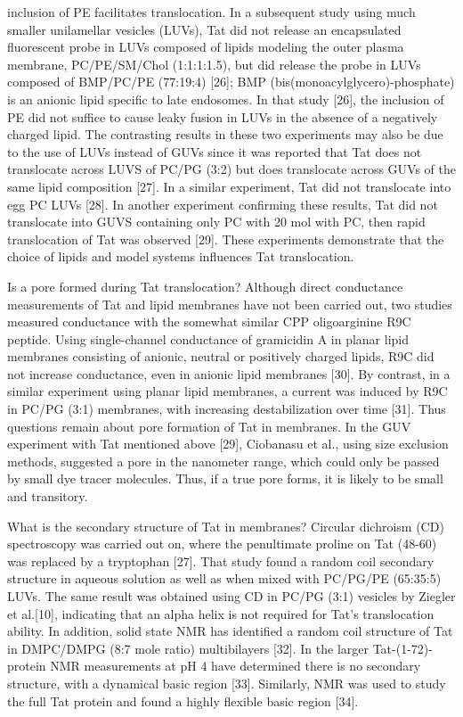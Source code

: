 inclusion of PE
facilitates translocation. In a subsequent study using much smaller unilamellar 
vesicles (LUVs),
Tat did not release an encapsulated fluorescent probe in LUVs composed of 
lipids modeling the
outer plasma membrane, PC/PE/SM/Chol (1:1:1:1.5), but did release the probe in 
LUVs
composed of BMP/PC/PE (77:19:4) [26]; BMP (bis(monoacylglycero)-phosphate) is 
an anionic
lipid specific to late endosomes. In that study [26], the inclusion of PE did 
not suffice to cause
leaky fusion in LUVs in the absence of a negatively charged lipid. The 
contrasting results in
these two experiments may also be due to the use of LUVs instead of GUVs since 
it was reported
that Tat does not translocate across LUVS of PC/PG (3:2) but does translocate 
across GUVs of
the same lipid composition [27]. In a similar experiment, Tat did not 
translocate into egg PC
LUVs [28]. In another experiment confirming these results, Tat did not 
translocate into GUVS
containing only PC with 20 mol%
with PC, then
rapid translocation of Tat was observed [29]. These experiments demonstrate 
that the choice of
lipids and model systems influences Tat translocation.

Is a pore formed during Tat translocation? Although direct conductance 
measurements of
Tat and lipid membranes have not been carried out, two studies measured 
conductance with the
somewhat similar CPP oligoarginine R9C peptide. Using single-channel 
conductance of
gramicidin A in planar lipid membranes consisting of anionic, neutral or 
positively charged
lipids, R9C did not increase conductance, even in anionic lipid membranes [30]. 
By contrast, in
a similar experiment using planar lipid membranes, a current was induced by R9C 
in PC/PG
(3:1) membranes, with increasing destabilization over time [31]. Thus questions 
remain about
pore formation of Tat in membranes. In the GUV experiment with Tat mentioned 
above [29],
Ciobanasu et al., using size exclusion methods, suggested a pore in the 
nanometer range, which
could only be passed by small dye tracer molecules. Thus, if a true pore forms, 
it is likely to be
small and transitory.

What is the secondary structure of Tat in membranes? Circular dichroism (CD)
spectroscopy was carried out on, where the penultimate proline on Tat (48-60) 
was replaced by a
tryptophan [27]. That study found a random coil secondary structure in aqueous 
solution as well
as when mixed with PC/PG/PE (65:35:5) LUVs. The same result was obtained using 
CD in
PC/PG (3:1) vesicles by Ziegler et al.[10], indicating that an alpha helix is 
not required for Tat’s
translocation ability. In addition, solid state NMR has identified a random 
coil structure of Tat in
DMPC/DMPG (8:7 mole ratio) multibilayers [32]. In the larger Tat-(1-72)-protein 
NMR
measurements at pH 4 have determined there is no secondary structure, with a 
dynamical basic
region [33]. Similarly, NMR was used to study the full Tat protein and found a 
highly flexible
basic region [34].

